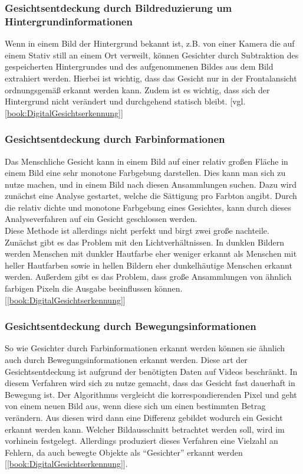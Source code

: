         \subsubsection{Gesichtsentdeckung durch Bildreduzierung um Hintergrundinformationen}
        \label{subsubsec:face_detection_bildreduzierung_um_hintergrundinformationen}
            Wenn in einem Bild der Hintergrund bekannt ist, z.B. von einer Kamera die auf einem Stativ still an einem Ort verweilt, können Gesichter durch Subtraktion des gespeicherten Hintergrundes und des aufgenommenen Bildes aus dem Bild extrahiert werden. Hierbei ist wichtig, dass das Gesicht nur in der Frontalansicht ordnungsgemäß erkannt werden kann. Zudem ist es wichtig, dass sich der Hintergrund nicht verändert und durchgehend statisch bleibt. [vgl. \ref{book:DigitalGesichtserkennung}]
        
        \subsubsection{Gesichtsentdeckung durch Farbinformationen}
        \label{subsubsec:face_detection_with_color_information}
            Das Menschliche Gesicht kann in einem Bild auf einer relativ großen Fläche in einem Bild eine sehr monotone Farbgebung darstellen. Dies kann man sich zu nutze machen, und in einem Bild nach diesen Ansammlungen suchen. Dazu wird zunächst eine Analyse gestartet, welche die Sättigung pro Farbton angibt. Durch die relativ dichte und monotone Farbgebung eines Gesichtes, kann durch dieses Analyseverfahren auf ein Gesicht geschlossen werden.\\
            Diese Methode ist allerdings nicht perfekt und birgt zwei große nachteile. Zunächst gibt es das Problem mit den Lichtverhältnissen. In dunklen Bildern werden Menschen mit dunkler Hautfarbe eher weniger erkannt als Menschen mit heller Hautfarben sowie in hellen Bildern eher dunkelhäutige Menschen erkannt werden. Außerdem gibt es das Problem, dass große Ansammlungen von ähnlich farbigen Pixeln die Ausgabe beeinflussen können. [\ref{book:DigitalGesichtserkennung}]

        \subsubsection{Gesichtsentdeckung durch Bewegungsinformationen}
        \label{subsubsec:face_detection_durch_bewegungsinformationen}
            So wie Gesichter durch Farbinformationen erkannt werden können sie ähnlich auch durch Bewegungsinformationen erkannt werden. Diese art der Gesichtsentdeckung ist aufgrund der benötigten Daten auf Videos beschränkt. In diesem Verfahren wird sich zu nutze gemacht, dass das Gesicht fast dauerhaft in Bewegung ist. Der Algorithmus vergleicht die korrespondierenden Pixel und geht von einem neuen Bild aus, wenn diese sich um einen bestimmten Betrag verändern. Aus diesen wird dann eine Differenz gebildet wodurch ein Gesicht erkannt werden kann. Welcher Bildausschnitt betrachtet werden soll, wird im vorhinein festgelegt. Allerdings produziert dieses Verfahren eine Vielzahl an Fehlern, da auch bewegte Objekte als \enquote{Gesichter} erkannt werden [\ref{book:DigitalGesichtserkennung}].

